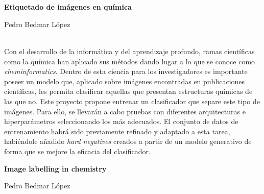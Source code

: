 \chapter*{}


\thispagestyle{empty}

\begin{center}
{\large\bfseries Etiquetado de imágenes en química}\\
\end{center}
\begin{center}
Pedro Bedmar López\\
\end{center}


\vspace{0.7cm}
\\

Con el desarrollo de la informática y del aprendizaje profundo, ramas científicas como la química han aplicado sus métodos dando lugar a lo que se conoce como \textit{cheminformatics}. Dentro de esta ciencia para los investigadores es importante poseer un modelo que, aplicado sobre imágenes encontradas en publicaciones científicas, les permita clasificar aquellas que presentan estructuras químicas de las que no. Este proyecto propone entrenar un clasificador que separe este tipo de imágenes. Para ello, se llevarán a cabo pruebas con diferentes arquitecturas e hiperparámetros seleccionando los más adecuados. El conjunto de datos de entrenamiento habrá sido previamente refinado y adaptado a esta tarea, habiéndole añadido \textit{hard negatives} creados a partir de un modelo generativo de forma que se mejore la eficacia del clasificador.
\cleardoublepage


\thispagestyle{empty}


\begin{center}
{\large\bfseries Image labelling in chemistry}\\
\end{center}
\begin{center}
Pedro Bedmar López\\
\end{center}

\\

